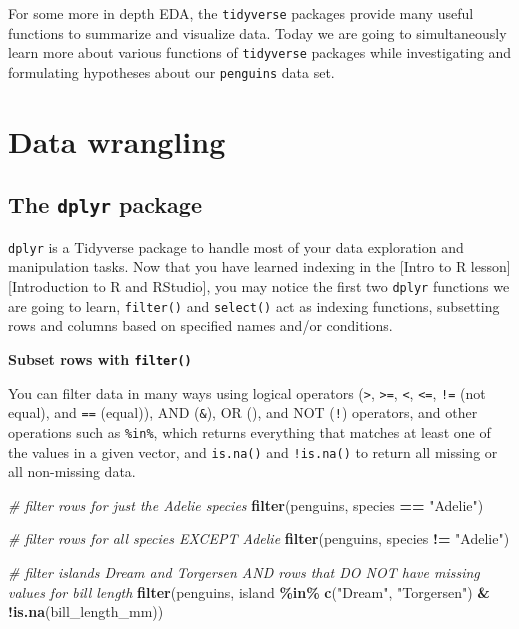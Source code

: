 \documentclass[
]{book}
\newenvironment{Shaded}{\begin{snugshade}}{\end{snugshade}}
\newcommand{\CommentTok}[1]{\textcolor[rgb]{0.56,0.35,0.01}{\textit{#1}}}
\newcommand{\FunctionTok}[1]{\textcolor[rgb]{0.13,0.29,0.53}{\textbf{#1}}}
\newcommand{\NormalTok}[1]{#1}
\newcommand{\SpecialCharTok}[1]{\textcolor[rgb]{0.81,0.36,0.00}{\textbf{#1}}}
\newcommand{\StringTok}[1]{\textcolor[rgb]{0.31,0.60,0.02}{#1}}
\begin{document}
For some more in depth EDA, the \texttt{tidyverse} packages provide many useful functions to summarize and visualize data. Today we are going to simultaneously learn more about various functions of \texttt{tidyverse} packages while investigating and formulating hypotheses about our \texttt{penguins} data set.

\hypertarget{data-wrangling}{%
\section{Data wrangling}\label{data-wrangling}}

\hypertarget{the-dplyr-package-1}{%
\subsection{\texorpdfstring{The \texttt{dplyr} package}{The dplyr package}}\label{the-dplyr-package-1}}

\texttt{dplyr} is a Tidyverse package to handle most of your data exploration and manipulation tasks. Now that you have learned indexing in the {[}Intro to R lesson{]}{[}Introduction to R and RStudio{]}, you may notice the first two \texttt{dplyr} functions we are going to learn, \texttt{filter()} and \texttt{select()} act as indexing functions, subsetting rows and columns based on specified names and/or conditions.

\textbf{Subset rows with \texttt{filter()}}

You can filter data in many ways using logical operators (\texttt{\textgreater{}}, \texttt{\textgreater{}=}, \texttt{\textless{}}, \texttt{\textless{}=}, \texttt{!=} (not equal), and \texttt{==} (equal)), AND (\texttt{\&}), OR (\texttt{\textbar{}}), and NOT (\texttt{!}) operators, and other operations such as \texttt{\%in\%}, which returns everything that matches at least one of the values in a given vector, and \texttt{is.na()} and \texttt{!is.na()} to return all missing or all non-missing data.

\begin{Shaded}
\begin{Highlighting}[]
\CommentTok{\# filter rows for just the Adelie species}
\FunctionTok{filter}\NormalTok{(penguins, species }\SpecialCharTok{==} \StringTok{"Adelie"}\NormalTok{)}

\CommentTok{\# filter rows for all species EXCEPT Adelie}
\FunctionTok{filter}\NormalTok{(penguins, species }\SpecialCharTok{!=} \StringTok{"Adelie"}\NormalTok{)}

\CommentTok{\# filter islands Dream and Torgersen AND rows that DO NOT have  missing values for bill length}
\FunctionTok{filter}\NormalTok{(penguins, island }\SpecialCharTok{\%in\%} \FunctionTok{c}\NormalTok{(}\StringTok{"Dream"}\NormalTok{, }\StringTok{"Torgersen"}\NormalTok{) }\SpecialCharTok{\&} \SpecialCharTok{!}\FunctionTok{is.na}\NormalTok{(bill\_length\_mm))}
\end{Highlighting}
\end{Shaded}
\end{document}
